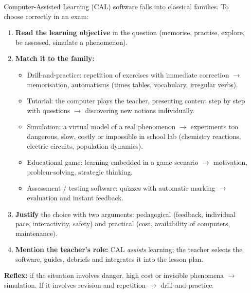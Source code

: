 \documentclass[11pt]{article}
\newcommand{\cle}[1]{{\popxbold\color{popdark}#1}}
\begin{document}
\begin{methode}
Computer-Assisted Learning (CAL) software falls into classical families. To choose correctly in an exam:
\begin{enumerate}
\item \textbf{Read the learning objective} in the question (memorise, practise, explore, be assessed, simulate a phenomenon).
\item \textbf{Match it to the family:}
\begin{itemize}
\item \cle{Drill-and-practice}: repetition of exercises with immediate correction $\rightarrow$ memorisation, automatisms (times tables, vocabulary, irregular verbs).
\item \cle{Tutorial}: the computer plays the teacher, presenting content step by step with questions $\rightarrow$ discovering new notions individually.
\item \cle{Simulation}: a virtual model of a real phenomenon $\rightarrow$ experiments too dangerous, slow, costly or impossible in school lab (chemistry reactions, electric circuits, population dynamics).
\item \cle{Educational game}: learning embedded in a game scenario $\rightarrow$ motivation, problem-solving, strategic thinking.
\item \cle{Assessment / testing software}: quizzes with automatic marking $\rightarrow$ evaluation and instant feedback.
\end{itemize}
\item \textbf{Justify} the choice with two arguments: pedagogical (feedback, individual pace, interactivity, safety) and practical (cost, availability of computers, maintenance).
\item \textbf{Mention the teacher's role:} CAL \emph{assists} learning; the teacher selects the software, guides, debriefs and integrates it into the lesson plan.
\end{enumerate}
\textbf{Reflex:} if the situation involves danger, high cost or invisible phenomena $\rightarrow$ simulation. If it involves revision and repetition $\rightarrow$ drill-and-practice.
\end{methode}
\end{document}
